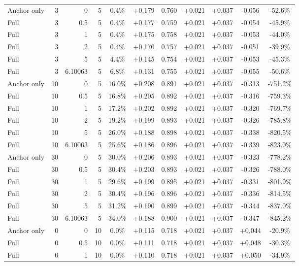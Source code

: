 \begin{table}[htbp]
\begin{tabular}{lrrrccccccc}
Anchor only & 3 & 0 & 5 & 0.4\% & +0.179 & 0.760 & +0.021 & +0.037 & -0.056 & -52.6\% \\
Full & 3 & 0.5 & 5 & 0.4\% & +0.177 & 0.759 & +0.021 & +0.037 & -0.054 & -45.9\% \\
Full & 3 & 1 & 5 & 0.4\% & +0.175 & 0.758 & +0.021 & +0.037 & -0.053 & -44.0\% \\
Full & 3 & 2 & 5 & 0.4\% & +0.170 & 0.757 & +0.021 & +0.037 & -0.051 & -39.9\% \\
Full & 3 & 5 & 5 & 4.4\% & +0.145 & 0.754 & +0.021 & +0.037 & -0.053 & -45.3\% \\
Full & 3 & 6.10063 & 5 & 6.8\% & +0.131 & 0.755 & +0.021 & +0.037 & -0.055 & -50.6\% \\
Anchor only & 10 & 0 & 5 & 16.0\% & +0.208 & 0.891 & +0.021 & +0.037 & -0.313 & -751.2\% \\
Full & 10 & 0.5 & 5 & 16.8\% & +0.205 & 0.892 & +0.021 & +0.037 & -0.316 & -759.3\% \\
Full & 10 & 1 & 5 & 17.2\% & +0.202 & 0.892 & +0.021 & +0.037 & -0.320 & -769.7\% \\
Full & 10 & 2 & 5 & 19.2\% & +0.199 & 0.893 & +0.021 & +0.037 & -0.326 & -785.8\% \\
Full & 10 & 5 & 5 & 26.0\% & +0.188 & 0.898 & +0.021 & +0.037 & -0.338 & -820.5\% \\
Full & 10 & 6.10063 & 5 & 25.6\% & +0.186 & 0.896 & +0.021 & +0.037 & -0.339 & -823.0\% \\
Anchor only & 30 & 0 & 5 & 30.0\% & +0.206 & 0.893 & +0.021 & +0.037 & -0.323 & -778.2\% \\
Full & 30 & 0.5 & 5 & 30.4\% & +0.203 & 0.893 & +0.021 & +0.037 & -0.326 & -788.0\% \\
Full & 30 & 1 & 5 & 29.6\% & +0.199 & 0.895 & +0.021 & +0.037 & -0.331 & -801.9\% \\
Full & 30 & 2 & 5 & 30.4\% & +0.196 & 0.896 & +0.021 & +0.037 & -0.336 & -814.5\% \\
Full & 30 & 5 & 5 & 31.2\% & +0.190 & 0.899 & +0.021 & +0.037 & -0.344 & -837.0\% \\
Full & 30 & 6.10063 & 5 & 34.0\% & +0.188 & 0.900 & +0.021 & +0.037 & -0.347 & -845.2\% \\
Anchor only & 0 & 0 & 10 & 0.0\% & +0.115 & 0.718 & +0.021 & +0.037 & +0.044 & -20.9\% \\
Full & 0 & 0.5 & 10 & 0.0\% & +0.111 & 0.718 & +0.021 & +0.037 & +0.048 & -30.3\% \\
Full & 0 & 1 & 10 & 0.0\% & +0.110 & 0.718 & +0.021 & +0.037 & +0.050 & -34.9\% \\

\end{tabular}
\end{table}
